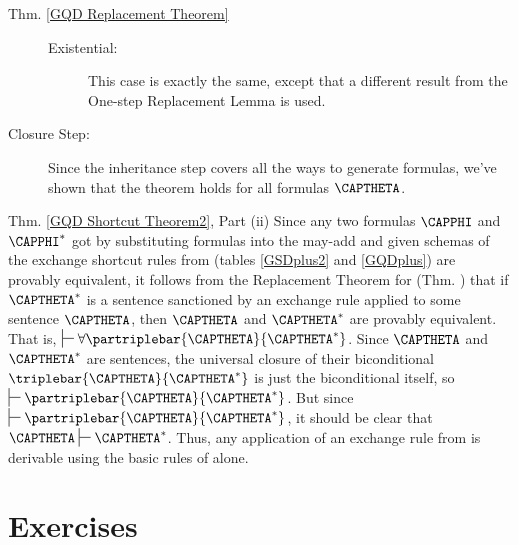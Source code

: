 \begin{PROOFOF}{Thm. \ref{GQD Replacement Theorem}}
\begin{description}
\begin{description}
\item[Existential:] This case is exactly the same, except that a different result from the One-step Replacement Lemma is used.

\end{description}

\item[Closure Step:]
Since the inheritance step covers all the ways to generate \GQL{} formulas, we've shown that the theorem holds for all \GQL{} formulas $\CAPTHETA$.
\end{description}
\end{PROOFOF}
\begin{PROOFOF}{Thm. \ref{GQD Shortcut Theorem2}, Part (ii)}
Since any two formulas $\CAPPHI$ and $\CAPPHI^*$ got by substituting \GQL{} formulas into the may-add and given schemas of the exchange shortcut rules from \GQDP{} (tables \ref{GSDplus2} and \ref{GQDplus}) are provably equivalent, it follows from the Replacement Theorem for \GQD{} (Thm. ) that if $\CAPTHETA^*$ is a sentence sanctioned by an exchange rule applied to some sentence $\CAPTHETA$, then $\CAPTHETA$ and $\CAPTHETA^*$ are provably equivalent. That is, $\sststile{}{}\forall\partriplebar{\CAPTHETA}{\CAPTHETA^*}$. Since $\CAPTHETA$ and $\CAPTHETA^*$ are sentences, the universal closure of their biconditional $\triplebar{\CAPTHETA}{\CAPTHETA^*}$ is just the biconditional itself, so  $\sststile{}{}\partriplebar{\CAPTHETA}{\CAPTHETA^*}$.
But since  $\sststile{}{}\partriplebar{\CAPTHETA}{\CAPTHETA^*}$, it should be clear that $\CAPTHETA\sststile{}{}\CAPTHETA^*$. 
Thus, any application of an exchange rule from \GQDP{} is derivable using the basic rules of \GQD{} alone. 
\end{PROOFOF}


\section{Exercises}


